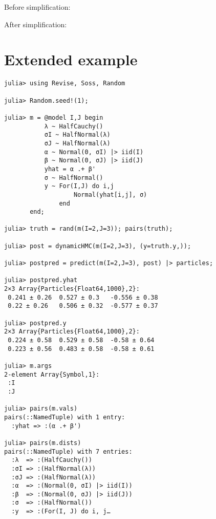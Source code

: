 \documentclass[anonymous=false, %
               format=acmsmall, %
               review=true, %
               screen=true, %
               nonacm=true]{acmart}
\begin{document}
Before simplification:


After simplification:



\section{Extended example }

\begin{verbatim}
julia> using Revise, Soss, Random

julia> Random.seed!(1);

julia> m = @model I,J begin
           λ ~ HalfCauchy()
           σI ~ HalfNormal(λ)
           σJ ~ HalfNormal(λ)
           α ~ Normal(0, σI) |> iid(I)
           β ~ Normal(0, σJ) |> iid(J)
           yhat = α .+ β'
           σ ~ HalfNormal()
           y ~ For(I,J) do i,j 
                   Normal(yhat[i,j], σ)
               end
       end;

julia> truth = rand(m(I=2,J=3)); pairs(truth);

julia> post = dynamicHMC(m(I=2,J=3), (y=truth.y,));

julia> postpred = predict(m(I=2,J=3), post) |> particles;

julia> postpred.yhat
2×3 Array{Particles{Float64,1000},2}:
 0.241 ± 0.26  0.527 ± 0.3   -0.556 ± 0.38
 0.22 ± 0.26   0.506 ± 0.32  -0.577 ± 0.37

julia> postpred.y
2×3 Array{Particles{Float64,1000},2}:
 0.224 ± 0.58  0.529 ± 0.58  -0.58 ± 0.64
 0.223 ± 0.56  0.483 ± 0.58  -0.58 ± 0.61

julia> m.args
2-element Array{Symbol,1}:
 :I
 :J

julia> pairs(m.vals)
pairs(::NamedTuple) with 1 entry:
  :yhat => :(α .+ β')

julia> pairs(m.dists)
pairs(::NamedTuple) with 7 entries:
  :λ  => :(HalfCauchy())
  :σI => :(HalfNormal(λ))
  :σJ => :(HalfNormal(λ))
  :α  => :(Normal(0, σI) |> iid(I))
  :β  => :(Normal(0, σJ) |> iid(J))
  :σ  => :(HalfNormal())
  :y  => :(For(I, J) do i, j…

\end{verbatim}
\end{document}
